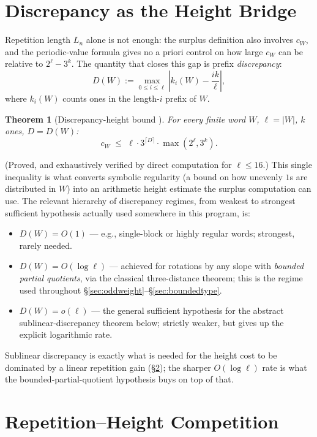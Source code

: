 \documentclass[11pt]{article}
\newtheorem{theorem}{Theorem}[section]
\begin{document}
\section{Discrepancy as the Height Bridge}
\label{sec:discrepancy}

Repetition length $L_n$ alone is not enough: the surplus definition also involves $c_W$, and the periodic-value formula gives no a priori control on how large $c_W$ can be relative to $2^\ell-3^k$. The quantity that closes this gap is prefix \emph{discrepancy}:
\[
D(W) := \max_{0\le i\le \ell} \left| k_i(W) - \frac{ik}{\ell}\right|,
\]
where $k_i(W)$ counts ones in the length-$i$ prefix of $W$.

\begin{theorem}[Discrepancy-height bound \cite{Phase1Discrepancy}]
For every finite word $W$, $\ell=|W|$, $k$ ones, $D=D(W)$:
\[
c_W \;\le\; \ell\cdot 3^{\lceil D\rceil}\cdot\max(2^\ell,3^k).
\]
\end{theorem}
(Proved, and exhaustively verified by direct computation for $\ell\le 16$.) This single inequality is what converts symbolic regularity (a bound on how unevenly $1$s are distributed in $W$) into an arithmetic height estimate the surplus computation can use. The relevant hierarchy of discrepancy regimes, from weakest to strongest sufficient hypothesis actually used somewhere in this program, is:
\begin{itemize}
\item $D(W)=O(1)$ --- e.g., single-block or highly regular words; strongest, rarely needed.
\item $D(W)=O(\log \ell)$ --- achieved for rotations by any slope with \emph{bounded partial quotients}, via the classical three-distance theorem; this is the regime used throughout \S\ref{sec:oddweight}--\S\ref{sec:boundedtype}.
\item $D(W)=o(\ell)$ --- the general sufficient hypothesis for the abstract sublinear-discrepancy theorem below; strictly weaker, but gives up the explicit logarithmic rate.
\end{itemize}
Sublinear discrepancy is exactly what is needed for the height cost to be dominated by a linear repetition gain (\S\ref{sec:repheight}); the sharper $O(\log\ell)$ rate is what the bounded-partial-quotient hypothesis buys on top of that.

\section{Repetition--Height Competition}
\label{sec:repheight}
\end{document}
